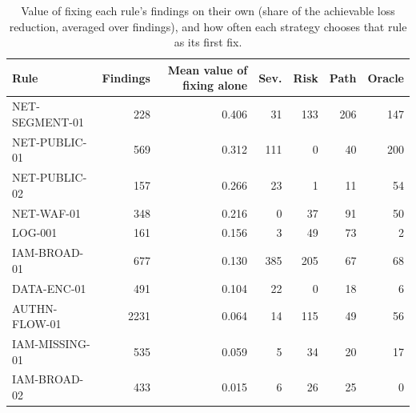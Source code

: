 \begin{table}[t]
\centering
\caption{Value of fixing each rule's findings on their own (share of the achievable loss reduction, averaged over findings), and how often each strategy chooses that rule as its first fix.}
\label{tab:rules}
\small
\setlength{\tabcolsep}{4pt}
\begin{tabular}{lrrrrrr}
\toprule
Rule & Findings & Mean value of fixing alone & Sev. & Risk & Path & Oracle \\
\midrule
NET-SEGMENT-01 & 228 & 0.406 & 31 & 133 & 206 & 147 \\
NET-PUBLIC-01 & 569 & 0.312 & 111 & 0 & 40 & 200 \\
NET-PUBLIC-02 & 157 & 0.266 & 23 & 1 & 11 & 54 \\
NET-WAF-01 & 348 & 0.216 & 0 & 37 & 91 & 50 \\
LOG-001 & 161 & 0.156 & 3 & 49 & 73 & 2 \\
IAM-BROAD-01 & 677 & 0.130 & 385 & 205 & 67 & 68 \\
DATA-ENC-01 & 491 & 0.104 & 22 & 0 & 18 & 6 \\
AUTHN-FLOW-01 & 2231 & 0.064 & 14 & 115 & 49 & 56 \\
IAM-MISSING-01 & 535 & 0.059 & 5 & 34 & 20 & 17 \\
IAM-BROAD-02 & 433 & 0.015 & 6 & 26 & 25 & 0 \\
\bottomrule
\end{tabular}
\end{table}
